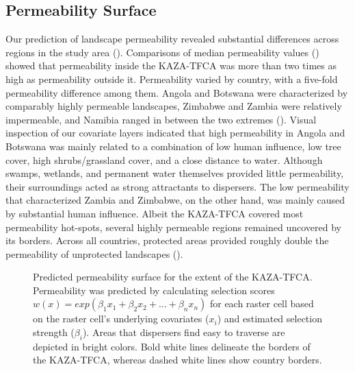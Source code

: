 \documentclass[abstract=on,10pt,a4paper,bibliography=totocnumbered]{article}
\begin{document}
\subsection{Permeability Surface}
Our prediction of landscape permeability revealed substantial differences across
regions in the study area (). Comparisons of median
permeability values () showed that permeability inside
the KAZA-TFCA was more than two times as high as permeability outside it.
Permeability varied by country, with a five-fold permeability difference among
them. Angola and Botswana were characterized by comparably highly permeable
landscapes, Zimbabwe and Zambia were relatively impermeable, and Namibia ranged
in between the two extremes (). Visual inspection of our
covariate layers indicated that high permeability in Angola and Botswana was
mainly related to a combination of low human influence, low tree cover, high
shrubs/grassland cover, and a close distance to water. Although swamps,
wetlands, and permanent water themselves provided little permeability, their
surroundings acted as strong attractants to dispersers. The low permeability
that characterized Zambia and Zimbabwe, on the other hand, was mainly caused by
substantial human influence. Albeit the KAZA-TFCA covered most permeability
hot-spots, several highly permeable regions remained uncovered by its borders.
Across all countries, protected areas provided roughly double the permeability
of unprotected landscapes ().

\begin{figure}[hbtp]
  \begin{center}
    \caption{Predicted permeability surface for the extent of the KAZA-TFCA.
    Permeability was predicted by calculating selection scores \(w(x) =
    exp(\beta_1 x_1 + \beta_2 x_2 + ... + \beta_n x_n)\) for each raster cell
    based on the raster cell's underlying covariates (\(x_i\)) and estimated
    selection strength (\(\beta_i\)). Areas that dispersers find easy to
    traverse are depicted in bright colors. Bold white lines delineate the
    borders of the KAZA-TFCA, whereas dashed white lines show country borders.}
    \label{PermeabilityMap}
  \end{center}
\end{figure}
\end{document}
